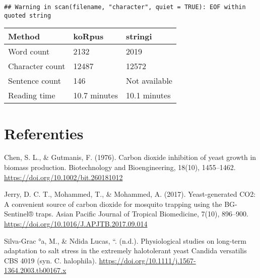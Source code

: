 \documentclass[
]{article}
\begin{document}
\begin{verbatim}
## Warning in scan(filename, "character", quiet = TRUE): EOF within quoted string
\end{verbatim}

\begin{tabular}{l|l|l}
\hline
Method & koRpus & stringi\\
\hline
Word count & 2132 & 2019\\
\hline
Character count & 12487 & 12572\\
\hline
Sentence count & 146 & Not available\\
\hline
Reading time & 10.7 minutes & 10.1 minutes\\
\hline
\end{tabular}

\section{Referenties}\label{referenties}

Chen, S. L., \& Gutmanis, F. (1976). Carbon dioxide inhibition of yeast growth in biomass production. Biotechnology and Bioengineering, 18(10), 1455--1462. \url{https://doi.org/10.1002/bit.260181012}

Jerry, D. C. T., Mohammed, T., \& Mohammed, A. (2017). Yeast-generated CO2: A convenient source of carbon dioxide for mosquito trapping using the BG-Sentinel® traps. Asian Pacific Journal of Tropical Biomedicine, 7(10), 896--900. \url{https://doi.org/10.1016/J.APJTB.2017.09.014}

Silva-Grac °a, M., \& Ndida Lucas, ``. (n.d.). Physiological studies on long-term adaptation to salt stress in the extremely halotolerant yeast Candida versatilis CBS 4019 (syn. C. halophila). \url{https://doi.org/10.1111/j.1567-1364.2003.tb00167.x}
\end{document}
